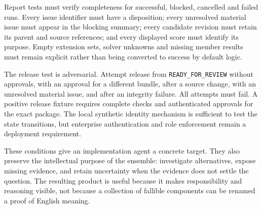 
Report tests must verify completeness for successful, blocked, cancelled and
failed runs. Every issue identifier must have a disposition; every unresolved
material issue must appear in the blocking summary; every candidate revision
must retain its parent and source references; and every displayed score must
identify its purpose. Empty extension sets, solver unknowns and missing member
results must remain explicit rather than being converted to success by default
logic.

The release test is adversarial. Attempt release from
\texttt{READY\_FOR\_REVIEW} without approvals, with an approval for a different
bundle, after a source change, with an unresolved material issue, and after an
integrity failure. All attempts must fail. A positive release fixture requires
complete checks and authenticated approvals for the exact package. The local
synthetic identity mechanism is sufficient to test the state transitions, but
enterprise authentication and role enforcement remain a deployment requirement.

These conditions give an implementation agent a concrete target. They also
preserve the intellectual purpose of the ensemble: investigate alternatives,
expose missing evidence, and retain uncertainty when the evidence does not settle
the question. The resulting product is useful because it makes responsibility
and reasoning visible, not because a collection of fallible components can be
renamed a proof of English meaning.
